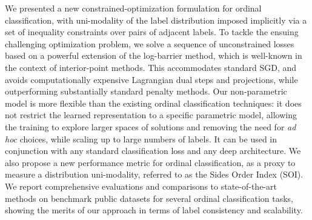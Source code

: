\documentclass[8pt]{article}
\theoremstyle{definition}
\begin{document}
We presented a new constrained-optimization formulation for ordinal classification, with uni-modality of the label distribution imposed implicitly via a set of inequality constraints over pairs of adjacent labels.
To tackle the ensuing challenging optimization problem, we solve a sequence of unconstrained losses based on a powerful extension of the log-barrier method, which is well-known in the context of interior-point methods. This accommodates standard SGD, and avoids computationally expensive Lagrangian dual steps and projections, while outperforming substantially standard penalty methods. Our non-parametric model is more flexible than the existing ordinal classification techniques: it does not restrict the learned representation to a specific parametric model, allowing the training to explore larger spaces of solutions and removing the need for {\em ad hoc} choices, while scaling up to large numbers of labels. It can be used in conjunction with any standard classification loss and any deep architecture. We also propose a new performance metric for ordinal classification, as a proxy to measure a distribution uni-modality, referred to as the Sides Order Index (SOI). We report comprehensive evaluations and comparisons to state-of-the-art methods on benchmark public datasets for several ordinal classification tasks, showing the merits of our approach in terms of label consistency and scalability.


\medskip

\small




\end{document}
